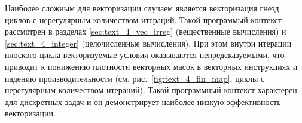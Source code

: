 Наиболее сложным для векторизации случаем является векторизация гнезд циклов с нерегулярным количеством итераций.
Такой программый контекст рассмотрен в разделах \ref{sec:text_4_vec_irreg} (вещественные вычисления) и \ref{sec:text_4_integer} (целочисленные вычисления).
При этом внутри итерации плоского цикла векторизуемые условия оказываются непредсказуемыми, что приводит к понижению плотности векторных масок\label{term:vector_mask_density8} в векторных инструкциях и падению производительности (см. рис.~\ref{fig:text_4_fin_map}, циклы с нерегулярным количеством итераций).
Такой программный контекст характерен для дискретных задач и он демонстрирует наиболее низкую эффективность векторизации.

